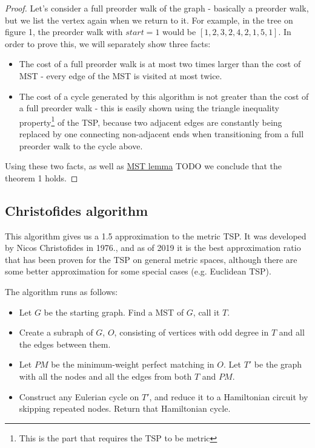 \documentclass[12pt,twoside,notitlepage]{report}
\begin{document}
\begin{proof}

Let's consider a full preorder walk  of the graph - basically a preorder walk, but we list the vertex again when we return to it. For example, in the tree on figure 1, the preorder walk with $start = 1$ would be $[1, 2, 3, 2, 4, 2, 1, 5, 1]$. In order to prove this, we will separately show three facts:

\begin{itemize}

\item The cost of a full preorder walk is at most two times larger than the cost of MST - every edge of the MST is visited at most twice.

\item The cost of a cycle generated by this algorithm is not greater than the cost of a full preorder walk - this is easily shown using the triangle inequality property\footnote{This is the part that requires the TSP to be metric} of the TSP, because two adjacent edges are constantly being replaced by one connecting non-adjacent ends when transitioning from a full preorder walk to the cycle above.

\end{itemize}

Using these two facts, as well as \hyperref[mstlemma]{MST lemma} TODO we conclude that the theorem 1 holds.

\end{proof}

\subsection{Christofides algorithm} %

This algorithm gives us a 1.5 approximation to the metric TSP. It was developed by Nicos Christofides in 1976., and as of 2019 it is the best approximation ratio that has been proven for the TSP on general metric spaces, although there are some better approximation for some special cases (e.g. Euclidean TSP).

The algorithm runs as follows:

\begin{itemize}

\item Let $G$ be the starting graph. Find a MST of $G$, call it $T$.
\item Create a subraph of $G$, $O$, consisting of vertices with odd degree in $T$ and all the edges between them.
\item Let $PM$ be the minimum-weight perfect matching in $O$. Let $T'$ be the graph with all the nodes and all the edges from both $T$ and $PM$.
\item Construct any Eulerian cycle on $T'$, and reduce it to a Hamiltonian circuit by skipping repeated nodes. Return that Hamiltonian cycle.

\end{itemize}
\end{document}
